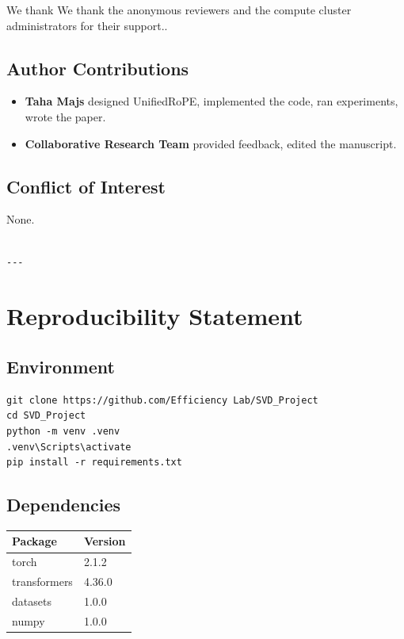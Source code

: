 {We thank We thank the anonymous reviewers and the compute cluster administrators for their support..

\subsection{Author Contributions}

\begin{itemize}
\item \textbf{Taha Majs} designed UnifiedRoPE, implemented the code, ran
  experiments, wrote the paper.
\item \textbf{Collaborative Research Team} provided feedback, edited the manuscript.

\end{itemize}
\subsection{Conflict of Interest}

None.
\begin{lstlisting}

---
\end{lstlisting}


\section{Reproducibility Statement}

\subsection{Environment}

\begin{lstlisting}
git clone https://github.com/Efficiency Lab/SVD_Project
cd SVD_Project
python -m venv .venv
.venv\Scripts\activate
pip install -r requirements.txt
\end{lstlisting}

\subsection{Dependencies}

\begin{table}[H]
\centering
\small
\begin{tabular}{ll}
\toprule
\textbf{Package} & \textbf{Version} \\
\midrule
torch & 2.1.2 \\
transformers & 4.36.0 \\
datasets & 1.0.0 \\
numpy & 1.0.0 \\
\bottomrule
\end{tabular}
\end{table}

}
